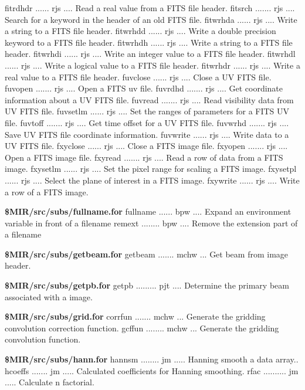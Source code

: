{\eightpoint\begintt
fitrdhdr ...... rjs .... Read a real value from a FITS file header.
fitsrch ....... rjs .... Search for a keyword in the header of an old FITS file.
fitwrhda ...... rjs .... Write a string to a FITS file header.
fitwrhdd ...... rjs .... Write a double precision keyword to a FITS file header.
fitwrhdh ...... rjs .... Write a string to a FITS file header.
\endtt}
{\eightpoint\begintt
fitwrhdi ...... rjs .... Write an integer value to a FITS file header.
fitwrhdl ...... rjs .... Write a logical value to a FITS file header.
fitwrhdr ...... rjs .... Write a real value to a FITS file header.
fuvclose ...... rjs .... Close a UV FITS file.
fuvopen ....... rjs .... Open a FITS uv file.
\endtt}
{\eightpoint\begintt
fuvrdhd ....... rjs .... Get coordinate information about a UV FITS file.
fuvread ....... rjs .... Read visibility data from UV FITS file.
fuvsetlm ...... rjs .... Set the ranges of parameters for a FITS UV file.
fuvtoff ....... rjs .... Get time offset for a UV FITS file.
fuvwrhd ....... rjs .... Save UV FITS file coordinate information.
\endtt}
{\eightpoint\begintt
fuvwrite ...... rjs .... Write data to a UV FITS file.
fxyclose ...... rjs .... Close a FITS image file.
fxyopen ....... rjs .... Open a FITS image file.
fxyread ....... rjs .... Read a row of data from a FITS image.
fxysetlm ...... rjs .... Set the pixel range for scaling a FITS image.
\endtt}
{\eightpoint\begintt
fxysetpl ...... rjs .... Select the plane of interest in a FITS image.
fxywrite ...... rjs .... Write a row of a FITS image.
\endtt}
\par{\bf \$MIR/src/subs/fullname.for}
{\eightpoint\begintt
fullname ...... bpw .... Expand an environment variable in front of a filename
remext ........ bpw .... Remove the extension part of a filename
\endtt}
\par{\bf \$MIR/src/subs/getbeam.for}
{\eightpoint\begintt
getbeam ....... mchw ... Get beam from image header.
\endtt}
\par{\bf \$MIR/src/subs/getpb.for}
{\eightpoint\begintt
getpb ......... pjt .... Determine the primary beam associated with a image.
\endtt}
\par{\bf \$MIR/src/subs/grid.for}
{\eightpoint\begintt
corrfun ....... mchw ... Generate the gridding convolution correction function.
gcffun ........ mchw ... Generate the gridding convolution function.
\endtt}
\par{\bf \$MIR/src/subs/hann.for}
{\eightpoint\begintt
hannsm ........ jm ..... Hanning smooth a data array..
hcoeffs ....... jm ..... Calculated coefficients for Hanning smoothing.
rfac .......... jm ..... Calculate n factorial.
\endtt}
